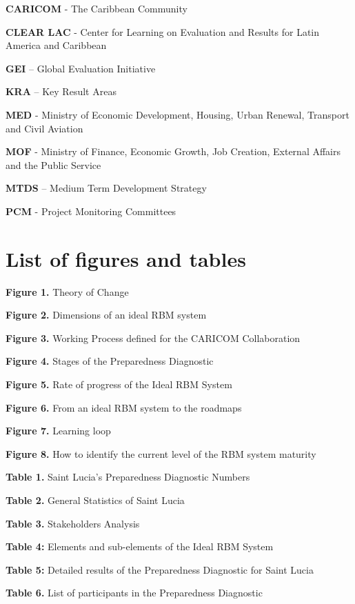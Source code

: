 \documentclass[
  10pt,
]{book}
\begin{document}
\textbf{CARICOM} - The Caribbean Community

\textbf{CLEAR LAC} - Center for Learning on Evaluation and Results for Latin America and Caribbean

\textbf{GEI} -- Global Evaluation Initiative

\textbf{KRA} -- Key Result Areas

\textbf{MED} - Ministry of Economic Development, Housing, Urban Renewal, Transport and Civil Aviation

\textbf{MOF} - Ministry of Finance, Economic Growth, Job Creation, External Affairs and the Public Service

\textbf{MTDS} -- Medium Term Development Strategy

\textbf{PCM} - Project Monitoring Committees

\hypertarget{list-of-figures-and-tables}{%
\chapter*{List of figures and tables}\label{list-of-figures-and-tables}}

\textbf{Figure 1.} Theory of Change

\textbf{Figure 2.} Dimensions of an ideal RBM system

\textbf{Figure 3.} Working Process defined for the CARICOM Collaboration

\textbf{Figure 4.} Stages of the Preparedness Diagnostic

\textbf{Figure 5.} Rate of progress of the Ideal RBM System

\textbf{Figure 6.} From an ideal RBM system to the roadmaps

\textbf{Figure 7.} Learning loop

\textbf{Figure 8.} How to identify the current level of the RBM system maturity

\textbf{Table 1.} Saint Lucia's Preparedness Diagnostic Numbers

\textbf{Table 2.} General Statistics of Saint Lucia

\textbf{Table 3.} Stakeholders Analysis

\textbf{Table 4:} Elements and sub-elements of the Ideal RBM System

\textbf{Table 5:} Detailed results of the Preparedness Diagnostic for Saint Lucia

\textbf{Table 6.} List of participants in the Preparedness Diagnostic
\end{document}
